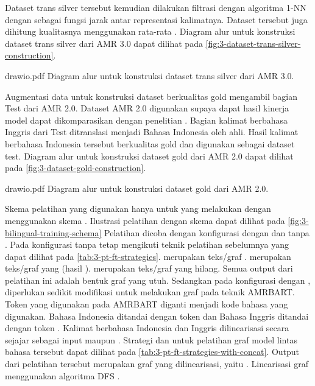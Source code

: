 Dataset trans silver tersebut kemudian dilakukan filtrasi dengan algoritma 1-NN dengan \cossim{} sebagai fungsi jarak antar representasi kalimatnya.
Dataset tersebut juga dihitung kualitasnya menggunakan rata-rata \cossim{}.
Diagram alur untuk konstruksi dataset trans silver dari AMR 3.0 dapat dilihat pada \cref{fig:3-dataset-trans-silver-construction}.

  {drawio.pdf}
  {Diagram alur untuk konstruksi dataset trans silver dari AMR 3.0.}

Augmentasi data untuk konstruksi dataset berkualitas gold mengambil bagian Test  dari AMR 2.0.
Dataset AMR 2.0 digunakan supaya dapat hasil kinerja model dapat dikomparasikan dengan penelitian \textcite{putra2022}.
Bagian kalimat berbahasa Inggris dari Test  ditranslasi menjadi Bahasa Indonesia oleh ahli.
Hasil kalimat berbahasa Indonesia tersebut berkualitas gold dan digunakan sebagai dataset test.
Diagram alur untuk konstruksi dataset gold dari AMR 2.0 dapat dilihat pada \cref{fig:3-dataset-gold-construction}.

  {drawio.pdf}
  {Diagram alur untuk konstruksi dataset gold dari AMR 2.0.}

\newcommand\graphMasked{\codesm{\textcolor[rgb]{0,.33,0}{<g>$g_1$,..[mask]..,$g_m$</g>}}}
\newcommand\graphBarMasked{\codesm{\textcolor[rgb]{0,.33,0}{<g>[mask]</g>}}}
\newcommand\idTagged[1]{\codesm{\textcolor{purple}{<id>#1</id>}}}
\newcommand\enTagged[1]{\codesm{\textcolor{blue}{<en>#1</en>}}}
\newcommand\sTagged[1]{\codesm{\textcolor{purple}{<s>#1</s>}}}

Skema pelatihan yang digunakan hanya untuk yang melakukan \amrparsing{} dengan menggunakan skema .
Ilustrasi pelatihan dengan skema  dapat dilihat pada \cref{fig:3-bilingual-training-schema}
Pelatihan dicoba dengan konfigurasi dengan dan tanpa .
Pada konfigurasi tanpa  tetap mengikuti teknik pelatihan sebelumnya yang dapat dilihat pada \cref{tab:3-pt-ft-strategies}.
 merupakan teks/graf .
 merupakan teks/graf yang  (hasil \denoising{}).
 merupakan teks/graf yang hilang.
Semua output dari pelatihan ini adalah bentuk graf yang utuh.
Sedangkan pada konfigurasi dengan , diperlukan sedikit modifikasi untuk melakukan \pretraining{} graf pada teknik \gls{AMRBART}.
Token  yang digunakan pada \gls{AMRBART} diganti menjadi kode bahasa yang digunakan.
Bahasa Indonesia ditandai dengan token  dan Bahasa Inggris ditandai dengan token .
Kalimat berbahasa Indonesia dan Inggris dilinearisasi secara sejajar sebagai input \pretraining{} maupun \finetuning{}.
Strategi \pretraining{} dan \finetuning{} untuk pelatihan graf model \amrparsing{} lintas bahasa tersebut dapat dilihat pada \cref{tab:3-pt-ft-strategies-with-concat}.
Output dari pelatihan tersebut merupakan graf \AMR{} yang dilinearisasi, yaitu .
Linearisasi graf menggunakan algoritma \gls{DFS} .

